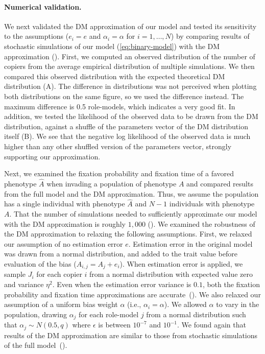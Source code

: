 \documentclass[12pt]{extarticle}
\begin{document}
\paragraph{Numerical validation.}
We next validated the DM approximation of our model
and tested its sensitivity to the assumptions ($e_i=e$ and $\alpha_i=\alpha$ for $i=1,\ldots,N$) by comparing results of stochastic simulations of our model (\cref{eq:binary-model}) with the DM approximation ().
First, we computed an observed distribution of the number of copiers from the average empirical distribution of multiple simulations.
We then compared this observed distribution with the expected theoretical DM distribution (A).
The difference in distributions was not perceived when plotting both distributions on the same figure, so we used the difference instead.
The maximum difference is 0.5 role-models, which indicates a very good fit.
In addition, we tested the likelihood of the observed data to be drawn from the DM distribution, against a shuffle of the parameters vector of the DM distribution itself (B). We see that the negative log likelihood of the observed data is much higher than any other shuffled version of the parameters vector, strongly supporting our approximation.

Next, we examined the fixation probability and fixation time of a favored phenotype $\hat{A}$ when invading a population of phenotype $A$ and compared results from the full model and the DM approximation.
Thus, we assume the population has a single individual with phenotype $\hat{A}$ and $N-1$ individuals with phenotype $A$. 
That the number of simulations needed to sufficiently approximate our model with the DM approximation is roughly $1,000$ ().
We examined the robustness of the DM approximation to relaxing the following assumptions.
First, we relaxed our assumption of no estimation error $e$.
Estimation error in the original model was drawn from a normal distribution, and added to the trait value before evaluation of the bias ($A_{i,j} = A_j + e_i$).
When estimation error is applied, we sample $J_i$ for each copier $i$ from a normal distribution with expected value zero and variance $\eta^2$. %
Even when the estimation error variance is $0.1$, both the fixation probability and fixation time approximations are accurate~(). 
We also relaxed our assumption of a uniform bias weight $\alpha$ (i.e., $\alpha_i=\alpha$). We allowed $\alpha$ to vary in the population, drawing $\alpha_j$ for each role-model $j$ from a normal distribution such that $\alpha_j \sim N(0.5,q)$ where $\epsilon$ is between $10^{-7}$ and $10^{-1}$. 
We found again that results of the DM approximation are similar to those from stochastic simulations of the full model~().
\end{document}
